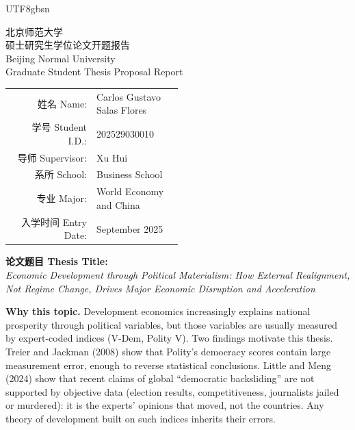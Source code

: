 \documentclass[10pt]{article}
\begin{document}
\begin{CJK}{UTF8}{gbsn}

\begin{center}
    {\LARGE 北京师范大学}\\[4pt]
    {\large 硕士研究生学位论文开题报告}\\[2pt]
    {\large Beijing Normal University}\\[2pt]
    {\large Graduate Student Thesis Proposal Report}\\[18pt]
\end{center}

\begin{center}
\begin{tabular}{r p{0.5\linewidth}}
    姓名 Name: & Carlos Gustavo Salas Flores \\[4pt]
    学号 Student I.D.: & 202529030010 \\[4pt]
    导师 Supervisor: & Xu Hui \\[4pt]
    系所 School: & Business School \\[4pt]
    专业 Major: & World Economy and China \\[4pt]
    入学时间 Entry Date: & September 2025 \\[4pt]
\end{tabular}
\end{center}

\vspace{8pt}
\noindent\textbf{论文题目 Thesis Title:}\\
\emph{Economic Development through Political Materialism: How External Realignment, Not Regime Change, Drives Major Economic Disruption and Acceleration}

\newpage


\vspace{6pt}
\noindent\textbf{Why this topic.} Development economics increasingly explains national prosperity through political variables, but those variables are usually measured by expert-coded indices (V-Dem, Polity V). Two findings motivate this thesis. Treier and Jackman (2008) show that Polity's democracy scores contain large measurement error, enough to reverse statistical conclusions. Little and Meng (2024) show that recent claims of global ``democratic backsliding'' are not supported by objective data (election results, competitiveness, journalists jailed or murdered): it is the experts' opinions that moved, not the countries. Any theory of development built on such indices inherits their errors.


\end{CJK}
\end{document}
